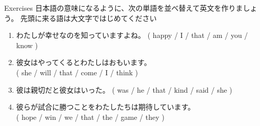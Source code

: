 \documentclass[aspectratio=169,xcolor={dvipsnames,table}]{beamer}
\begin{document}
\begin{frame}[plain]{Exercises}
日本語の意味になるように、次の単語を並べ替えて英文を作りましょう。
先頭に来る語は大文字ではじめてください

\begin{enumerate}
 \item わたしが幸せなのを知っていますよね。
( happy / I / that / am / you / know )\\
 \item 彼女はやってくるとわたしはおもいます。\\
( she / will / that / come / I / think )\\
 \item 彼は親切だと彼女はいった。
( was / he / that / kind / said / she )\\
 \item 彼らが試合に勝つことをわたしたちは期待しています。\\
( hope / win / we / that / the / game / they )\\
\end{enumerate}

\end{frame}
\end{document}
